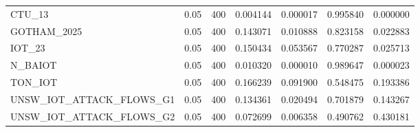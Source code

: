 \begin{tabular}{lllllll}
CTU\_13 & 0.05 & 400 & 0.004144 & 0.000017 & 0.995840 & 0.000000 \\
GOTHAM\_2025 & 0.05 & 400 & 0.143071 & 0.010888 & 0.823158 & 0.022883 \\
IOT\_23 & 0.05 & 400 & 0.150434 & 0.053567 & 0.770287 & 0.025713 \\
N\_BAIOT & 0.05 & 400 & 0.010320 & 0.000010 & 0.989647 & 0.000023 \\
TON\_IOT & 0.05 & 400 & 0.166239 & 0.091900 & 0.548475 & 0.193386 \\
UNSW\_IOT\_ATTACK\_FLOWS\_G1 & 0.05 & 400 & 0.134361 & 0.020494 & 0.701879 & 0.143267 \\
UNSW\_IOT\_ATTACK\_FLOWS\_G2 & 0.05 & 400 & 0.072699 & 0.006358 & 0.490762 & 0.430181 \\
\bottomrule
\end{tabular}
